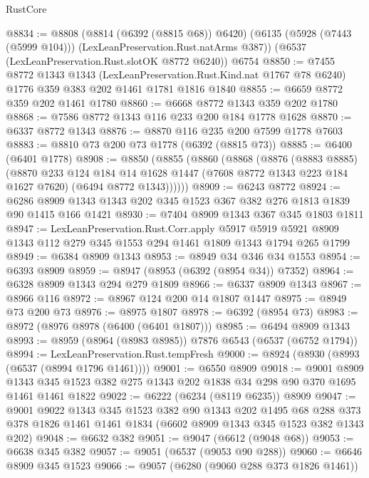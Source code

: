 \begin{lexlean}{RustCore}
\begin{coremodule}
@8834 := @8808
    (@8814 (@6392 (@8815 @68)) @6420)
    (@6135 (@5928 (@7443 (@5999 @104))) (LexLeanPreservation.Rust.natArms @387))
    (@6537 (LexLeanPreservation.Rust.slotOK @8772 @6240))
    @6754
@8850 := @7455
    @8772
    @1343
    @1343
    (LexLeanPreservation.Rust.Kind.nat @1767 @78 @6240)
    @1776
    @359
    @383
    @202
    @1461
    @1781
    @1816
    @1840
@8855 := @6659 @8772 @359 @202 @1461 @1780
@8860 := @6668 @8772 @1343 @359 @202 @1780
@8868 := @7586 @8772 @1343 @116 @233 @200 @184 @1778 @1628
@8870 := @6337 @8772 @1343
@8876 := @8870 @116 @235 @200 @7599 @1778 @7603
@8883 := @8810 @73 @200 @73 @1778 (@6392 (@8815 @73))
@8885 := @6400 (@6401 @1778)
@8908 := @8850
    (@8855
      (@8860
        (@8868
          (@8876
            (@8883 @8885)
            (@8870
              @233
              @124
              @184
              @14
              @1628
              @1447
              (@7608 @8772 @1343 @223 @184 @1627 @7620)
              (@6494 @8772 @1343))))))
@8909 := @6243 @8772
@8924 := @6286 @8909 @1343 @1343 @202 @345 @1523 @367 @382 @276 @1813 @1839 @90 @1415 @166 @1421
@8930 := @7404 @8909 @1343 @367 @345 @1803 @1811
@8947 := LexLeanPreservation.Rust.Corr.apply
    @5917
    @5919
    @5921
    @8909
    @1343
    @112
    @279
    @345
    @1553
    @294
    @1461
    @1809
    @1343
    @1794
    @265
    @1799
@8949 := @6384 @8909 @1343
@8953 := @8949 @34 @346 @34 @1553
@8954 := @6393 @8909
@8959 := @8947 (@8953 (@6392 (@8954 @34)) @7352)
@8964 := @6328 @8909 @1343 @294 @279 @1809
@8966 := @6337 @8909 @1343
@8967 := @8966 @116
@8972 := @8967 @124 @200 @14 @1807 @1447
@8975 := @8949 @73 @200 @73
@8976 := @8975 @1807
@8978 := @6392 (@8954 @73)
@8983 := @8972 (@8976 @8978 (@6400 (@6401 @1807)))
@8985 := @6494 @8909 @1343
@8993 := @8959 (@8964 (@8983 @8985)) @7876 @6543 (@6537 (@6752 @1794))
@8994 := LexLeanPreservation.Rust.tempFresh
@9000 := @8924 (@8930 (@8993 (@6537 (@8994 @1796 @1461))))
@9001 := @6550 @8909
@9018 := @9001
    @8909
    @1343
    @345
    @1523
    @382
    @275
    @1343
    @202
    @1838
    @34
    @298
    @90
    @370
    @1695
    @1461
    @1461
    @1822
@9022 := @6222 (@6234 (@8119 @6235)) @8909
@9047 := @9001
    @9022
    @1343
    @345
    @1523
    @382
    @90
    @1343
    @202
    @1495
    @68
    @288
    @373
    @378
    @1826
    @1461
    @1461
    @1834
    (@6602 @8909 @1343 @345 @1523 @382 @1343 @202)
@9048 := @6632 @382
@9051 := @9047 (@6612 (@9048 @68))
@9053 := @6638 @345 @382
@9057 := @9051 (@6537 (@9053 @90 @288))
@9060 := @6646 @8909 @345 @1523
@9066 := @9057 (@6280 (@9060 @288 @373 @1826 @1461))

\end{coremodule}
\end{lexlean}
